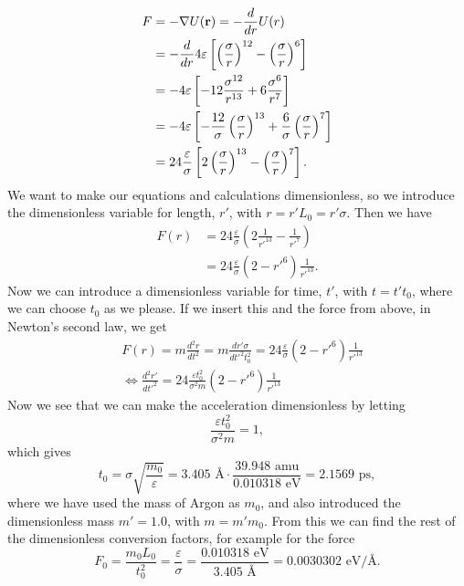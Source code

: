 \begin{align*}
    F &= -\nabla U(\mathbf{r}) = - \frac{d}{dr}U(r) \\
    &= -\frac{d}{dr} 4\varepsilon \left[\left(\frac{\sigma}{r}\right)^{12} - \left(\frac{\sigma}{r}\right)^6 \right] \\
    &= -4\varepsilon \left[-12 \frac{\sigma^{12}}{r^{13}} + 6 \frac{\sigma^6}{r^7} \right] \\
    &= -4 \varepsilon \left[ -\frac{12}{\sigma}\left(\frac{\sigma}{r}\right)^{13} + \frac{6}{\sigma}\left(\frac{\sigma}{r}\right)^7 \right] \\
    &= 24 \frac{\varepsilon}{\sigma} \left[ 2\left(\frac{\sigma}{r}\right)^{13} - \left(\frac{\sigma}{r}\right)^7 \right].
\end{align*}
We want to make our equations and calculations dimensionless, so we introduce the dimensionless variable for length, $r'$, with $r = r'L_0 = r' \sigma$. Then we have
\begin{align*}
    F(r) &= 24 \frac{\varepsilon}{\sigma} \left( 2 \frac{1}{r'^{13}} - \frac{1}{r'^7}\right) \\
    &= 24 \frac{\varepsilon}{\sigma}  \left( 2 - r'^{6} \right) \frac{1}{r'^{13}}.
\end{align*}
Now we can introduce a dimensionless variable for time, $t'$, with $t = t't_0$, where we can choose $t_0$ as we please. If we insert this and the force from above, in Newton's second law, we get
\begin{align*}
    &F(r) = m\frac{d^2r}{dt^2} = m\frac{dr'\sigma}{dt'^2t_0^2} = 24 \frac{\varepsilon}{\sigma}  \left( 2 - r'^{6} \right) \frac{1}{r'^{13}}\\
    &\Leftrightarrow \frac{d^2r'}{dt'^2} = 24 \frac{\varepsilon t_0^2}{\sigma^2 m} \left( 2 - r'^{6} \right) \frac{1}{r'^{13}}
\end{align*}
Now we see that we can make the acceleration dimensionless by letting
\[
    \frac{\varepsilon t_0^2}{\sigma^2 m} = 1,
\]
which gives
\[
    t_0 = \sigma\sqrt{\frac{m_0}{\varepsilon}} = 3.405\text{ \AA} \cdot \frac{39.948\text{ amu}}{0.010318\text{ eV}} = 2.1569\text{ ps},
\]
where we have used the mass of Argon as $m_0$, and also introduced the dimensionless mass $m' = 1.0$, with $m = m'm_0$. From this we can find the rest of the dimensionless conversion factors, for example for the force
\[
    F_0 = \frac{m_0 L_0}{t_0^2} = \frac{\varepsilon}{\sigma} = \frac{0.010318\text{ eV}}{3.405\text{ \AA}} = 0.0030302\text{ eV/\AA}.
\]
